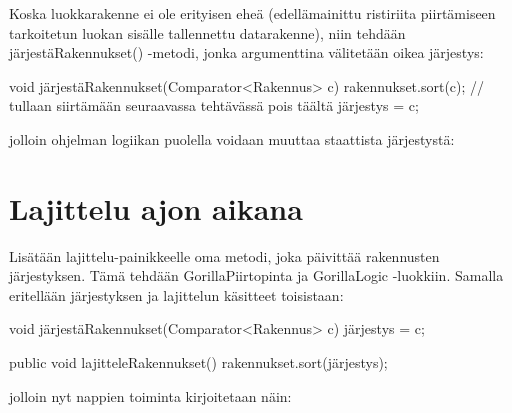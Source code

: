 Koska luokkarakenne ei ole erityisen eheä (edellämainittu ristiriita
piirtämiseen tarkoitetun luokan sisälle tallennettu datarakenne), niin tehdään
järjestäRakennukset() -metodi, jonka argumenttina välitetään oikea järjestys:

\begin{javacode}
void järjestäRakennukset(Comparator<Rakennus> c) {
		rakennukset.sort(c); // tullaan siirtämään seuraavassa tehtävässä pois täältä
		järjestys = c;
}
\end{javacode}

jolloin ohjelman logiikan puolella voidaan muuttaa staattista järjestystä:


\section{Lajittelu ajon aikana}

\label{}

Lisätään lajittelu-painikkeelle oma metodi, joka päivittää rakennusten
järjestyksen. Tämä tehdään GorillaPiirtopinta ja GorillaLogic -luokkiin. Samalla
eritellään järjestyksen ja lajittelun käsitteet toisistaan:

\begin{javacode} 
void järjestäRakennukset(Comparator<Rakennus> c) {
		järjestys = c;
}

public void lajitteleRakennukset() {
		rakennukset.sort(järjestys);
}
\end{javacode}

jolloin nyt nappien toiminta kirjoitetaan näin:


